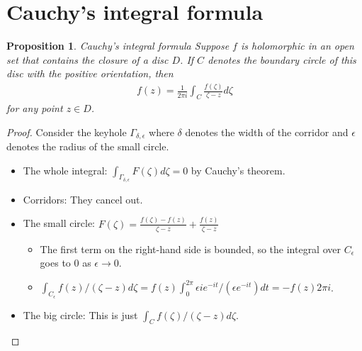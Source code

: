\documentclass[12pt, psamsfonts]{amsart}
\newtheorem{prop}[thm]{Proposition}
\theoremstyle{definition}
\theoremstyle{remark}
\numberwithin{equation}{section}
\begin{document}
\section{Cauchy’s integral formula}

\begin{prop}{Cauchy’s integral formula}
  Suppose $f$ is holomorphic in an open set that contains the closure of a disc $D$.
  If $C$ denotes the boundary circle of this disc with the positive orientation, then
  \begin{align*}
    f(z) = \frac{1}{2\pi i}\int_{C} \frac{f(\zeta)}{\zeta - z}d\zeta
  \end{align*}
  for any point $z \in D$.
\end{prop}

\begin{proof}
  Consider the keyhole $\Gamma_{\delta, \epsilon}$ where $\delta$ denotes the width of the corridor and $\epsilon$ denotes the radius of the small circle. 
  \begin{itemize}
    \item
      The whole integral: $\int_{\Gamma_{\delta, \epsilon}} F(\zeta)d\zeta = 0$ by Cauchy's theorem.
    \item
      Corridors: They cancel out.
    \item
      The small circle:
      $F(\zeta) = \frac{f(\zeta) - f(z)}{\zeta - z} + \frac{f(z)}{\zeta - z}$ 
      \begin{itemize}
        \item
          The first term on the right-hand side is bounded, so the integral over $C_{\epsilon}$ goes to 0 as $\epsilon \rightarrow 0$.
        \item
          $\int_{C_{\epsilon}} f(z) / (\zeta - z) d\zeta = f(z) \int_{0}^{2\pi} \epsilon ie^{-it}/(\epsilon e^{-it}) dt = -f(z)2\pi i$.
      \end{itemize}
    \item
      The big circle:
      This is just $\int_{C} f(\zeta) / (\zeta - z) d\zeta$.
  \end{itemize}
\end{proof}
\end{document}
